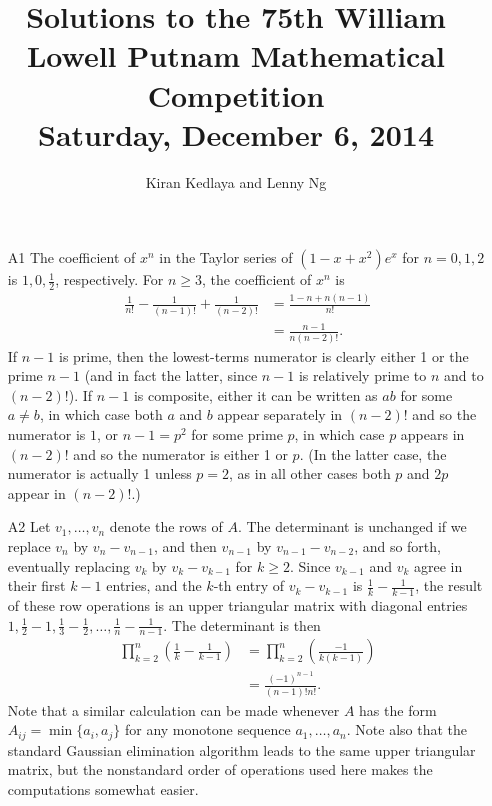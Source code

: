 \documentclass[amssymb,twocolumn,pra,10pt,aps]{revtex4-1}
\begin{document}
\title{Solutions to the 75th William Lowell Putnam Mathematical Competition \\
    Saturday, December 6, 2014}
\author{Kiran Kedlaya and Lenny Ng}
\noaffiliation
\maketitle

\begin{itemize}
\item[A1]
The coefficient of $x^n$ in the Taylor series of $(1-x+x^2)e^x$ for 
$n=0,1,2$ is $1,0,\frac{1}{2}$, respectively. For $n\geq 3$, the coefficient of 
$x^n$ is
\begin{align*}
\frac{1}{n!} - \frac{1}{(n-1)!} + \frac{1}{(n-2)!}
&= \frac{1-n+n(n-1)}{n!} \\
&= \frac{n-1}{n(n-2)!}.
\end{align*}
If $n-1$ is prime, then the lowest-terms numerator is clearly either 1 or the prime $n-1$ (and in fact the latter, since $n-1$ is relatively prime to $n$ and to $(n-2)!$).
 If $n-1$ is composite,
either it can be written as $ab$ for some $a \neq b$, in which case both $a$ and $b$ appear separately in $(n-2)!$ and so the numerator is $1$,
or $n-1 = p^2$ for some prime $p$, in which case $p$ appears in $(n-2)!$
and so the numerator is either 1 or $p$. (In the latter case, the numerator is actually 1 unless $p=2$, as in all other cases both $p$ and $2p$ appear in $(n-2)!$.)

\item[A2]
Let $v_1,\ldots,v_n$ denote the rows of $A$. The determinant is 
unchanged if we replace $v_n$ by $v_n-v_{n-1}$, and then $v_{n-1}$ by 
$v_{n-1}-v_{n-2}$, and so forth, eventually replacing $v_k$ by 
$v_k-v_{k-1}$ for $k\geq 2$. Since $v_{k-1}$ and $v_k$ agree in their 
first $k-1$ entries, and the $k$-th entry of $v_k-v_{k-1}$ is 
$\frac{1}{k} - \frac{1}{k-1}$, the result of these row operations is an upper triangular 
matrix with diagonal entries $1,\frac{1}{2}-1,\frac{1}{3}-\frac{1}{2},\ldots,\frac{1}{n}-\frac{1}{n-1}$. The 
determinant is then
\begin{align*}
\prod_{k=2}^n \left( \frac{1}{k} - \frac{1}{k-1}\right) &= \prod_{k=2}^n \left(\frac{-1}{k(k-1)} \right) \\
&= 
\frac{(-1)^{n-1}}{(n-1)!n!}.
\end{align*}
Note that a similar calculation can be made whenever $A$ has the form $A_{ij} = \min\{a_i, a_j\}$ for any monotone sequence $a_1,\dots,a_n$. Note also that the standard Gaussian elimination algorithm leads to the same upper triangular matrix, but the nonstandard order of operations used here makes the computations somewhat easier.


\end{itemize}
\end{document}

